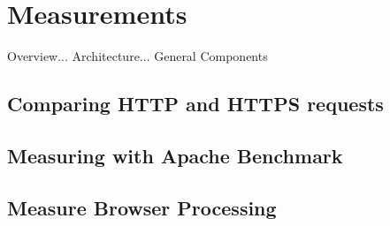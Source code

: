 \chapter{Measurements}
\label{chap:measurements}

Overview... Architecture... General Components

\section{Comparing HTTP and HTTPS requests}

\section{Measuring with Apache Benchmark}

\section{Measure Browser Processing}
